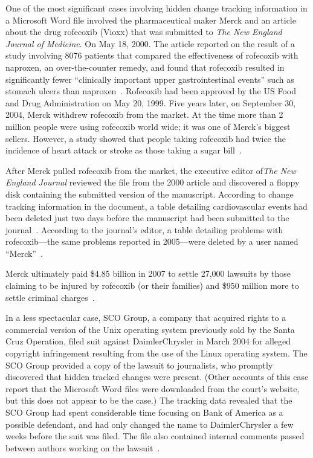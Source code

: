 \documentclass{article}
\begin{document}
One of the most significant cases involving hidden change tracking
information in a Microsoft Word file involved the pharmaceutical maker Merck and
an article about the drug rofecoxib (Vioxx) that was submitted to
\emph{The New England Journal of Medicine}. On May 18, 2000. The
article reported on the result of a study involving 8076 patients that
compared the effectiveness of rofecoxib with naproxen, an
over-the-counter remedy, and found that rofecoxib resulted in
significantly fewer ``clinically important upper gastrointestinal
events'' such as stomach ulcers than
naproxen~\cite{bombardier-2000}. Rofecoxib had been approved by the US
Food and Drug Administration on May 20, 1999. Five years later, on
September 30, 2004, Merck withdrew rofecoxib from the market. At the
time more than 2 million people were using rofecoxib world wide; it was
one of Merck's biggest sellers. However, a study showed that people
taking rofecoxib had twice the incidence of heart attack or stroke as
those taking a sugar bill~\cite{npr-vioxx}.

After Merck pulled rofecoxib from the market, the executive editor
of\emph{The New England Journal} reviewed the file from the 2000
article and discovered a floppy disk containing the submitted version
of the manuscript. According to change tracking information in the
document, a table detailing cardiovascular events had been deleted
just two days before the manuscript had been submitted to the
journal~\cite{nejm-concern}. According to the journal's editor, a
table detailing problems with rofecoxib---the same problems reported
in 2005---were deleted by a user named
``Merck''~\cite{forbes-mercks-deleted-data}.

Merck ultimately paid \$4.85 billion in 2007 to settle 27,000 lawsuits
by those claiming to be injured by rofecoxib (or their families) and
 \$950 million more to settle criminal charges~\cite{nyt-vioxx-settlement}. 

In a less spectacular case, SCO Group, a company that acquired rights
to a commercial version of the Unix
operating system previously sold by the Santa Cruz Operation, filed
suit against DaimlerChrysler in March 2004 for alleged copyright infringement
resulting from the use of the Linux operating system. The SCO Group provided a copy of the lawsuit to
journalists, who
promptly discovered that hidden tracked changes were present. (Other accounts of this case
  report that the Microsoft Word files were downloaded from the
  court's website, but this does not appear to be the case.) The
tracking data revealed that the SCO Group had spent considerable time focusing on Bank of America as a
possible defendant, and had only changed the name to DaimlerChrysler a
few weeks before the suit was filed. The file also contained internal
comments passed between authors working on the
lawsuit~\cite{sco-hidden-text}.
\end{document}

